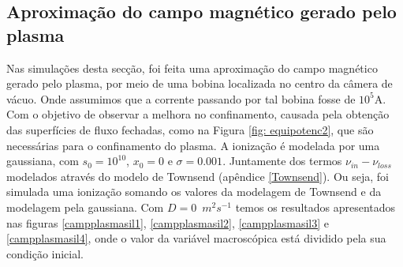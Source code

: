 \documentclass[12pt,oneside,a4paper]{abntex2}
\begin{document}
\subsection{Aproximação do campo magnético gerado pelo plasma}
\label{maggerado} %
\noindent Nas simulações desta secção, foi feita uma aproximação do campo magnético gerado pelo plasma, por meio de uma bobina localizada no centro da câmera de vácuo. Onde assumimos que a corrente passando por tal bobina fosse de $10^5$A. 
Com o objetivo de observar a melhora no confinamento, causada pela obtenção das superfícies de fluxo fechadas, como na Figura \ref{fig: equipotenc2}, que são necessárias para o confinamento do plasma. 
A ionização é modelada por uma gaussiana, com $s_0=10^{10}$, $x_0=0$ e $\sigma=0.001$. 
Juntamente dos termos $\nu_{in}- \nu_{loss}$ modelados através do modelo de Townsend (apêndice \ref{Townsend}). Ou seja, foi simulada uma ionização somando os valores da modelagem de Townsend e da modelagem pela gaussiana. 
Com $D=0$\ $m^2s^{-1}$ temos os resultados apresentados nas figuras \ref{campplasmasil1}, \ref{campplasmasil2}, \ref{campplasmasil3} e \ref{campplasmasil4}, onde o valor da variável macroscópica está dividido pela sua condição inicial.
\end{document}
